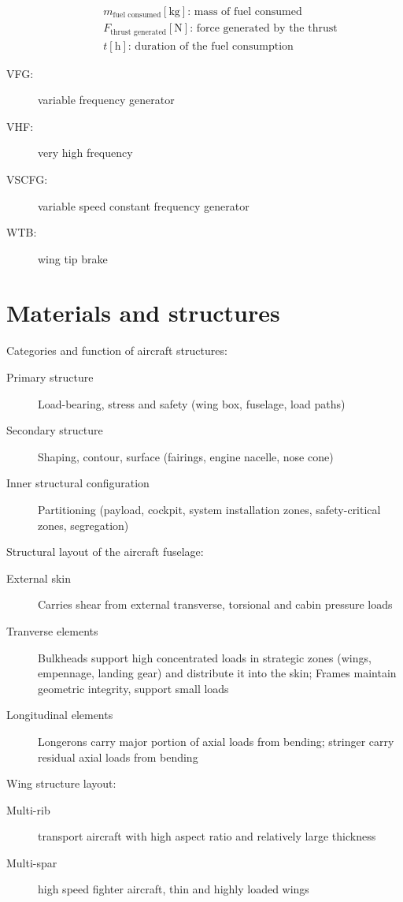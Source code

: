 \documentclass[10pt, twocolumn]{article}
\begin{document}
\begin{description}
\[\begin{array}{|l}
            m_\text{fuel consumed} [\si{\kilogram}] \text{: mass of fuel consumed}          \\
            F_\text{thrust generated} [\si{\newton}] \text{: force generated by the thrust} \\
            t [\si{\hour}] \text{: duration of the fuel consumption}
          \end{array}
        \]
  \item[VFG:] variable frequency generator
  \item[VHF:] very high frequency
  \item[VSCFG:] variable speed constant frequency generator
  \item[WTB:] wing tip brake
\end{description}


\section{Materials and structures}
Categories and function of aircraft structures:
\begin{description}
  \item[Primary structure] Load-bearing, stress and safety (wing box, fuselage, load paths)
  \item[Secondary structure] Shaping, contour, surface (fairings, engine nacelle, nose cone)
  \item[Inner structural configuration] Partitioning (payload, cockpit, system installation zones, safety-critical zones, segregation)
\end{description}

Structural layout of the aircraft fuselage:
\begin{description}
  \item[External skin] Carries shear from external transverse, torsional and cabin pressure loads
  \item[Tranverse elements] Bulkheads support high concentrated loads in strategic zones (wings, empennage, landing gear) and distribute it into the skin; Frames maintain geometric integrity, support small loads
  \item[Longitudinal elements] Longerons carry major portion of axial loads from bending; stringer carry residual axial loads from bending
\end{description}

Wing structure layout:
\begin{description}
  \item[Multi-rib] transport aircraft with high aspect ratio and relatively large thickness
  \item[Multi-spar] high speed fighter aircraft, thin and highly loaded wings
\end{description}
\end{document}
